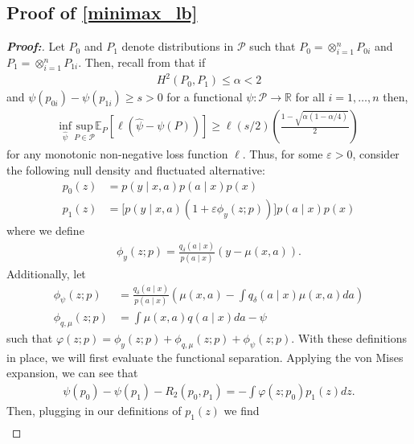 \documentclass[11pt,twoside]{article}
\theoremstyle{definition}
\theoremstyle{remark}
\begin{document}
\subsection{Proof of \texorpdfstring{\cref{minimax_lb}}{Theorem 2}} \label{minimax_lb_proof}
\begin{proof}[\textbf{Proof:}]
Let $P_0$ and $P_1$ denote distributions in $\mathcal{P}$ such that $P_0 = \otimes^n_{i=1} P_{0i}$ and $P_1 = \otimes^n_{i=1} P_{1i}$. Then, recall from  \cite{tsbakov2009} that if
\begin{align*}
    H^2(P_0, P_1) \leq \alpha < 2
\end{align*}
and $\psi(p_{0i}) - \psi(p_{1i}) \geq s > 0$ for a functional $\psi : \mathcal{P} \to \mathbb{R}$ for all $i = 1, \ldots, n$ then,
\begin{align*}
    \underset{\widehat{\psi}}{\text{inf}} \: \underset{P \in \mathcal{P}}{\text{sup}} \mathbb{E}_P \left[\ell\left(\widehat{\psi} - \psi(P) \right) \right] \geq \ell(s/2)\left(\frac{1 - \sqrt{\alpha(1 - \alpha/4)}}{2} \right)
\end{align*}
for any monotonic non-negative loss function $\ell$. Thus, for some $\varepsilon > 0$, consider the following null density and fluctuated alternative:
\begin{align*}
    p_0(z) &= p(y \mid x, a) p(a \mid x) p(x) \\
    p_1(z) &= \Big[p(y \mid x, a)(1 + \varepsilon \phi_y(z; p)) \Big]p(a \mid x) p(x)
\end{align*}
where we define
\begin{align*}
    \phi_y(z; p) = \frac{q_\delta(a \mid x)}{p(a \mid x)}(y - \mu(x, a)).
\end{align*}
Additionally, let 
\begin{align*}
    \phi_{\psi}(z; p) &= \frac{q_\delta(a \mid x)}{p(a \mid x)}\left( \mu(x, a) - \int q_\delta(a \mid x) \mu(x, a)da \right) \\
    \phi_{q, \mu}(z; p) &= \int \mu(x, a) q(a \mid x) da - \psi 
\end{align*}
such that $\varphi(z; p) = \phi_y(z; p) + \phi_{q, \mu}(z; p) + \phi_{\psi}(z ;p)$. With these definitions in place, we will first evaluate the functional separation. Applying the von Mises expansion, we can see that
\begin{align*}
    \psi(p_0) - \psi(p_1) - R_2(p_0, p_1) = - \int \varphi(z; p_0) p_1(z)dz.
\end{align*}
Then, plugging in our definitions of $p_1(z)$ we find
\begin{align*}

\end{align*}
\end{proof}
\end{document}
